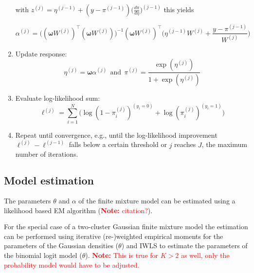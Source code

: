 \documentclass[article,nojss,shortnames]{jss}
\newcommand{\note}[1]{\textcolor{red}{\textbf{Note:} #1}}
\begin{document}
\begin{algorithm}
\begin{enumerate}
            with $\mathit{z}^{(j)} = \mathit{\eta}^{(j-1)} + (\mathit{y} - \mathit{\pi}^{(j-1)}) \Big(\frac{d\pi}{d\eta}\Big)^{(j-1)}$ this yields

            \begin{equation*}
                \mathit{\alpha}^{(j)} =
                    \big((\mathbf{\omega} \mathit{W}^{(j)})^\top
                    (\mathbf{\omega} \mathit{W}^{(j)})\big)^{-1}
                    (\mathbf{\omega} \mathit{W}^{(j)})^\top
                    \Big(\mathit{\eta}^{(j-1)} \mathit{W}^{(j)} + \frac{\mathit{y} - \mathit{\pi}^{(j-1)}}{W^{(j)}}\Big)
            \end{equation*}

        \item Update response:
            \begin{equation*}
                \mathit{\eta}^{(j)} = \mathbf{\omega}\mathit{\alpha}^{(j)}
                ~~\text{and}~~
                \mathit{\pi}^{(j)} = \frac{\exp(\mathit{\eta}^{(j)})}{1 + \exp(\mathit{\eta}^{(j)})}
            \end{equation*}

        \item Evaluate log-likelihood sum:
            \begin{equation*}
                \ell^{(j)} = %
                \sum_{i=1}^{N} \Big(\log(1 - \pi_i^{(j)})^{(y_i = 0)} + \log(\pi_i^{(j)})^{(y_i=1)}\Big)
            \end{equation*}

        \item Repeat until convergence, e.g., until the log-likelihood improvement
            $\ell^{(j)} - \ell^{(j-1)}$ falls below a certain threshold or $j$ reaches
            $J$, the maximum number of iterations.

    \end{enumerate}
\end{algorithm}



\subsection{Model estimation}

The parameters $\mathit{\theta}$ and $\mathit{\alpha}$ of the finite mixture model
can be estimated using a likelihood based EM algorithm (\note{citation?}).

For the special case of a two-cluster Gaussian finite mixture model the estimation
can be performed using iterative (re-)weighted empirical moments for the parameters
of the Gaussian densities ($\mathit{\theta}$) and IWLS to estimate the parameters
of the binomial logit model ($\mathit{\theta}$).
\note{This is true for $K>2$ as well, only the probability model would have to be adjusted.}
\end{document}
